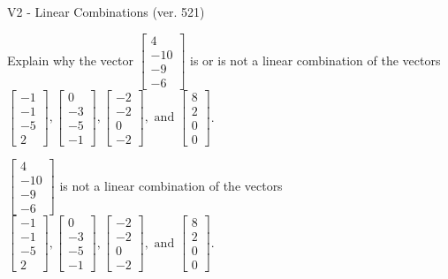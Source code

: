 \begin{exercise}
  \begin{exerciseTitle}V2 - Linear Combinations (ver. 521)\end{exerciseTitle}
  \begin{exerciseStatement}
    Explain why the vector \(\left[\begin{array}{c}
4 \\
-10 \\
-9 \\
-6
\end{array}\right]\)  is or is not a linear 
	combination of the vectors \(\left[\begin{array}{c}
-1 \\
-1 \\
-5 \\
2
\end{array}\right] , \left[\begin{array}{c}
0 \\
-3 \\
-5 \\
-1
\end{array}\right] , \left[\begin{array}{c}
-2 \\
-2 \\
0 \\
-2
\end{array}\right] , \text{ and } \left[\begin{array}{c}
8 \\
2 \\
0 \\
0
\end{array}\right]\).
	


  \end{exerciseStatement}
  \begin{exerciseAnswer}
   \(\left[\begin{array}{c}
4 \\
-10 \\
-9 \\
-6
\end{array}\right]\) 
  	 is not  
	a linear combination of the vectors \(\left[\begin{array}{c}
-1 \\
-1 \\
-5 \\
2
\end{array}\right] , \left[\begin{array}{c}
0 \\
-3 \\
-5 \\
-1
\end{array}\right] , \left[\begin{array}{c}
-2 \\
-2 \\
0 \\
-2
\end{array}\right] , \text{ and } \left[\begin{array}{c}
8 \\
2 \\
0 \\
0
\end{array}\right]\).


\end{exerciseAnswer}
\end{exercise}

